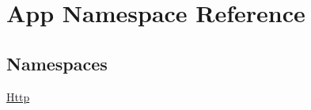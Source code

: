\hypertarget{namespace_app}{}\section{App Namespace Reference}
\label{namespace_app}
\subsection*{Namespaces}
\begin{DoxyCompactItemize}
\item 
 \mbox{\hyperlink{namespace_app_1_1_http}{Http}}
\end{DoxyCompactItemize}
